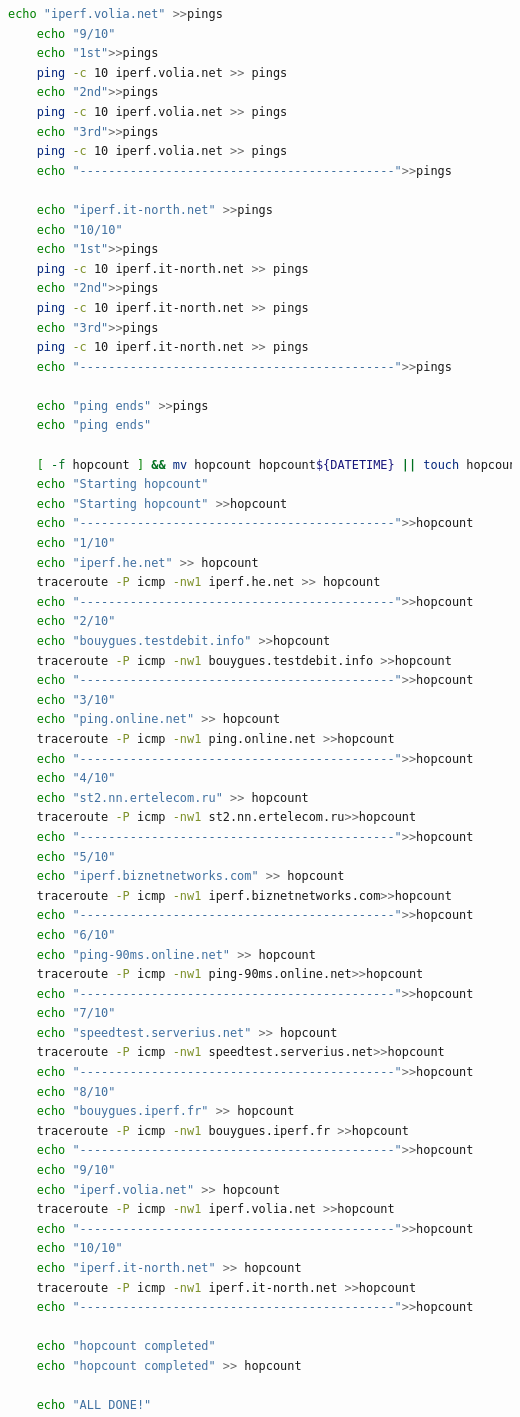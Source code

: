 \documentclass[paper=a4, fontsize=10pt]{scrartcl} %
\numberwithin{equation}{section} %
\numberwithin{figure}{section} %
\numberwithin{table}{section} %
\begin{document}
\begin{lstlisting}[language = bash]
    echo "iperf.volia.net" >>pings
    echo "9/10"
    echo "1st">>pings
    ping -c 10 iperf.volia.net >> pings
    echo "2nd">>pings
    ping -c 10 iperf.volia.net >> pings
    echo "3rd">>pings
    ping -c 10 iperf.volia.net >> pings
    echo "--------------------------------------------">>pings
    
    echo "iperf.it-north.net" >>pings
    echo "10/10"
    echo "1st">>pings
    ping -c 10 iperf.it-north.net >> pings
    echo "2nd">>pings
    ping -c 10 iperf.it-north.net >> pings
    echo "3rd">>pings
    ping -c 10 iperf.it-north.net >> pings
    echo "--------------------------------------------">>pings
    
    echo "ping ends" >>pings
    echo "ping ends"
    
    [ -f hopcount ] && mv hopcount hopcount${DATETIME} || touch hopcount
    echo "Starting hopcount"
    echo "Starting hopcount" >>hopcount
    echo "--------------------------------------------">>hopcount
    echo "1/10"
    echo "iperf.he.net" >> hopcount
    traceroute -P icmp -nw1 iperf.he.net >> hopcount 
    echo "--------------------------------------------">>hopcount
    echo "2/10"
    echo "bouygues.testdebit.info" >>hopcount
    traceroute -P icmp -nw1 bouygues.testdebit.info >>hopcount
    echo "--------------------------------------------">>hopcount
    echo "3/10"
    echo "ping.online.net" >> hopcount
    traceroute -P icmp -nw1 ping.online.net >>hopcount
    echo "--------------------------------------------">>hopcount
    echo "4/10"
    echo "st2.nn.ertelecom.ru" >> hopcount
    traceroute -P icmp -nw1 st2.nn.ertelecom.ru>>hopcount
    echo "--------------------------------------------">>hopcount
    echo "5/10"
    echo "iperf.biznetnetworks.com" >> hopcount
    traceroute -P icmp -nw1 iperf.biznetnetworks.com>>hopcount
    echo "--------------------------------------------">>hopcount
    echo "6/10"
    echo "ping-90ms.online.net" >> hopcount
    traceroute -P icmp -nw1 ping-90ms.online.net>>hopcount
    echo "--------------------------------------------">>hopcount
    echo "7/10"
    echo "speedtest.serverius.net" >> hopcount
    traceroute -P icmp -nw1 speedtest.serverius.net>>hopcount
    echo "--------------------------------------------">>hopcount
    echo "8/10"
    echo "bouygues.iperf.fr" >> hopcount
    traceroute -P icmp -nw1 bouygues.iperf.fr >>hopcount
    echo "--------------------------------------------">>hopcount
    echo "9/10"
    echo "iperf.volia.net" >> hopcount
    traceroute -P icmp -nw1 iperf.volia.net >>hopcount
    echo "--------------------------------------------">>hopcount
    echo "10/10"
    echo "iperf.it-north.net" >> hopcount
    traceroute -P icmp -nw1 iperf.it-north.net >>hopcount
    echo "--------------------------------------------">>hopcount
    
    echo "hopcount completed"
    echo "hopcount completed" >> hopcount
    
    echo "ALL DONE!"
\end{lstlisting}
\end{document}
